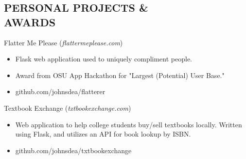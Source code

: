 \documentclass[margin]{res}
\begin{document}
\begin{resume}
\section{PERSONAL PROJECTS \&\\ AWARDS}
            Flatter Me Please ({\sl flattermeplease.com})
            \begin{itemize} \itemsep -2pt
                \item Flask web application used to uniquely compliment people.
                \item Award from OSU App Hackathon for "Largest (Potential) User Base."
                \item github.com/johnsdea/flatterer
            \end{itemize}
            Textbook Exchange ({\sl txtbookexchange.com})
            \begin{itemize} \itemsep -2pt
                \item Web application to help college students buy/sell textbooks locally. Written using Flask, 
                and utilizes an API for book lookup by ISBN.
                \item github.com/johnsdea/txtbookexchange
            \end{itemize}

\end{resume}
\end{document}

